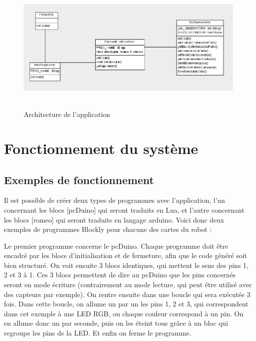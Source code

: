 \documentclass[12pt,francais]{report}
\begin{document}
\begin{figure}[!h]
\begin{addmargin}[-10em]{1em}
\includegraphics[scale=0.95]{./images/uml2.jpg}~\\[1.5cm]
\caption{Architecture de l'application}
\end{addmargin}
\end{figure}

\newpage
\chapter*{Fonctionnement du système}

\section*{Exemples de fonctionnement}

Il est possible de créer deux types de programmes avec l'application, l'un concernant les blocs [pcDuino] qui seront traduits en Lua, et l'autre concernant les blocs [romeo] qui seront traduits en langage arduino.
Voici donc deux exemples de programmes Blockly pour chacune des cartes du robot :

\bigskip

Le premier programme concerne le pcDuino. Chaque programme doit être encadré par les blocs d'initialisation et de fermeture, afin que le code généré soit bien structuré. On voit ensuite 3 blocs identiques, qui mettent le sens des pins 1, 2 et 3 à 1. Ces 3 blocs permettent de dire au pcDuino que les pins concernés seront en mode écriture (contrairement au mode lecture, qui peut être utilisé avec des capteurs par exemple). On rentre ensuite dans une boucle qui sera exécutée 3 fois. Dans cette boucle, on allume un par un les pins 1, 2 et 3, qui correspondent dans cet exemple à une LED RGB, ou chaque couleur correspond à un pin. On en allume donc un par seconde, puis on les éteint tous grâce à un bloc qui regroupe les pins de la LED. Et enfin on ferme le programme.
\end{document}
